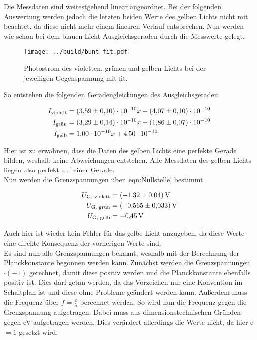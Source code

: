 \noindent Die Messdaten sind weitestgehend linear angeordnet. Bei der folgenden Auswertung werden jedoch die letzten beiden Werte des 
gelben Lichts nicht mit beachtet, da diese nicht mehr einem linearen Verlauf entsprechen. Nun werden wie schon bei dem blauen Licht 
Ausgleichsgeraden durch die Messwerte gelegt.

\begin{figure}[H]
    \centering
    \texttt{[image: ../build/bunt\_fit.pdf]}
    \caption{Photostrom des violetten, grünen und gelben Lichts bei der jeweiligen Gegenspannung mit fit.}
    \label{fig:bunt_fit}
\end{figure}

\noindent So entstehen die folgenden Geradengleichungen des Ausgleichsgeraden:

\begin{align*}
    I_\text{violett} &= \num {3.59\pm0.10e-10} x + \num{4.07\pm0.10e-10}\\
    I_\text{grün}    &= \num {3.29\pm0.14e-10} x + \num{1.86\pm0.07e-10}\\
    I_\text{gelb}    &= \num {1.00\pm0.00e-10} x + \num{4.50\pm0.00e-10}\\
\end{align*}

\noindent Hier ist zu erwähnen, dass die Daten des gelben Lichts eine perfekte Gerade bilden, weshalb keine Abweichungen entstehen. 
Alle Messdaten des gelben Lichts liegen also perfekt auf einer Gerade. \\
\noindent Nun werden die Grenzspannungen über \autoref{eqn:Nullstelle} bestimmt.

\begin{align}
    U_\text{G, violett} &= \qty{-1.32 \pm 0.04}{\volt}\\
    U_\text{G, grün} &= \qty{-0.565 \pm 0.033}{\volt}\\
    U_\text{G, gelb} &= \qty{-0.45 \pm 0.00}{\volt}
\end{align}

\noindent Auch hier ist wieder kein Fehler für das gelbe Licht anzugeben, da diese Werte eine direkte Konsequenz der vorherigen Werte sind.\\
\noindent Es sind nun alle Grenzspannungen bekannt, weshalb mit der Berechnung der Planckkonstante begonnen werden kann. Zunächst werden die 
Grenzspannungen $\cdot (-1)$ gerechnet, damit diese positiv werden und die Planckkonstante ebenfalls positiv ist. Dies darf getan werden, da 
das Vorzeichen nur eine Konvention im Schaltplan ist und diese ohne Probleme geändert werden kann. Außerdem muss die Frequenz über 
$f=\frac{c}{\lambda}$ berechnet werden. So wird nun die Frequenz gegen die Grenzspannung aufgetragen. Dabei muss aus dimensionstechnischen 
Gründen gegen eV aufgetragen werden. Dies verändert allerdings die Werte nicht, da hier e$=1$ gesetzt wird. 


